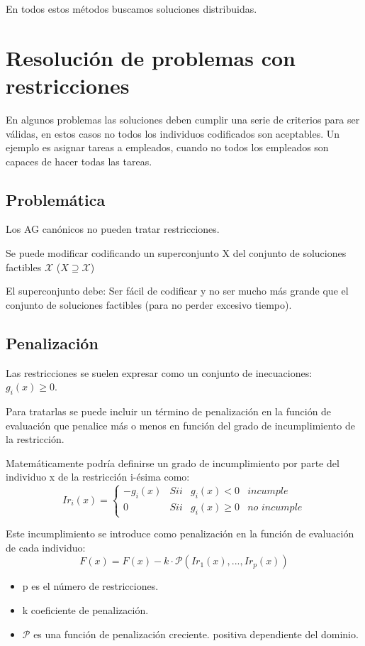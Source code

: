 \documentclass[12pt, twoside, openright]{report} %
\begin{document}
En todos estos métodos buscamos soluciones distribuidas.

\section{Resolución de problemas con restricciones}
En algunos problemas las soluciones deben cumplir una serie de criterios para ser válidas, en estos casos no todos los individuos codificados son aceptables. Un ejemplo es asignar tareas a empleados, cuando no todos los empleados son capaces de hacer todas las tareas.

\subsection{Problemática}
Los AG canónicos no pueden tratar restricciones.

Se puede modificar codificando un superconjunto X del conjunto de soluciones factibles $\mathcal{X}$ ($X \supseteq \mathcal{X}$)

El superconjunto debe: Ser fácil de codificar y no ser mucho más grande que el conjunto de soluciones factibles (para no perder excesivo tiempo).

\subsection{Penalización}
Las restricciones se suelen expresar como un conjunto de inecuaciones: $g_i(x) \geq 0$.

Para tratarlas se puede incluir un término de penalización en la función de evaluación que penalice más o menos en función del grado de incumplimiento de la restricción.

Matemáticamente podría definirse un grado de incumplimiento por parte del individuo x de la restricción i-ésima como:
$$Ir_i(x) = \left\{ \begin{array}{clll}
	-g_i(x) &  Sii & g_i(x)<0 & \textit{incumple} \\
	0 &  Sii & g_i(x)\geq 0 & \textit{no incumple}
\end{array} \right.$$

Este incumplimiento se introduce como penalización en la función de evaluación de cada individuo: 
$$F(x)=F(x)-k\cdot \mathcal{P}(Ir_1(x), ..., Ir_p(x))$$
\begin{itemize}
	\item p es el número de restricciones.
	\item k coeficiente de penalización.
	\item $\mathcal{P}$ es una función de penalización creciente.
	positiva dependiente del dominio.
\end{itemize}
\pagebreak
\end{document}
